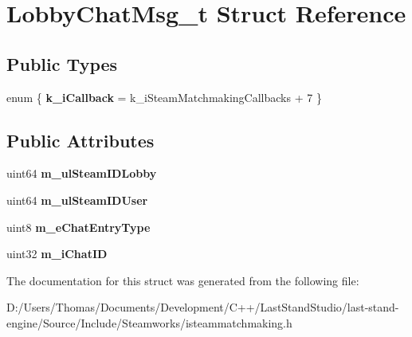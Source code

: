 \hypertarget{structLobbyChatMsg__t}{}\section{Lobby\+Chat\+Msg\+\_\+t Struct Reference}
\label{structLobbyChatMsg__t}
\subsection*{Public Types}
\begin{DoxyCompactItemize}
\item 
\hypertarget{structLobbyChatMsg__t_a117aae26e8fe8fd6d02403f5f6e6cb48}{}enum \{ {\bfseries k\+\_\+i\+Callback} = k\+\_\+i\+Steam\+Matchmaking\+Callbacks + 7
 \}\label{structLobbyChatMsg__t_a117aae26e8fe8fd6d02403f5f6e6cb48}

\end{DoxyCompactItemize}
\subsection*{Public Attributes}
\begin{DoxyCompactItemize}
\item 
\hypertarget{structLobbyChatMsg__t_a219040c030b77a37daed98d7f4e19258}{}uint64 {\bfseries m\+\_\+ul\+Steam\+I\+D\+Lobby}\label{structLobbyChatMsg__t_a219040c030b77a37daed98d7f4e19258}

\item 
\hypertarget{structLobbyChatMsg__t_a5bf773ba60aac45ce12c8b2d4a8d6c4e}{}uint64 {\bfseries m\+\_\+ul\+Steam\+I\+D\+User}\label{structLobbyChatMsg__t_a5bf773ba60aac45ce12c8b2d4a8d6c4e}

\item 
\hypertarget{structLobbyChatMsg__t_a17524709380caa83f5986bb84512db56}{}uint8 {\bfseries m\+\_\+e\+Chat\+Entry\+Type}\label{structLobbyChatMsg__t_a17524709380caa83f5986bb84512db56}

\item 
\hypertarget{structLobbyChatMsg__t_affa5bd26aec09e6d1ad8a47845680a5d}{}uint32 {\bfseries m\+\_\+i\+Chat\+I\+D}\label{structLobbyChatMsg__t_affa5bd26aec09e6d1ad8a47845680a5d}

\end{DoxyCompactItemize}


The documentation for this struct was generated from the following file\+:\begin{DoxyCompactItemize}
\item 
D\+:/\+Users/\+Thomas/\+Documents/\+Development/\+C++/\+Last\+Stand\+Studio/last-\/stand-\/engine/\+Source/\+Include/\+Steamworks/isteammatchmaking.\+h\end{DoxyCompactItemize}
